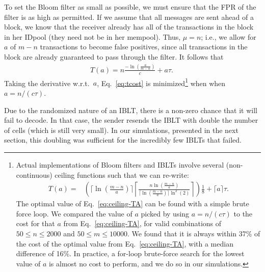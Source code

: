 To set the Bloom filter as small as possible, we must ensure
that the FPR of the filter is as high as permitted. If we assume 
that all \inv messages are sent ahead of a block, we know that the receiver already has all
of the transactions in the block in her IDpool (they need not be in her mempool). 
Thus, $\mu=n$; i.e.,  we allow for $a$ of $m-n$ transactions
to become false positives, since all transactions in the block are
already guaranteed to pass through the filter. It follows that
\vspace{0.5ex}
\begin{align}
T(a) = n\frac{-\ln(\frac{a}{m-n})}{c}+ a\tau.~\label{eq:tcost}
\end{align}
Taking the derivative w.r.t.\ $a$, Eq.~\ref{eq:tcost} is
minimized\footnote{ Actual implementations of Bloom filters and IBLTs
  involve several (non-continuous) ceiling functions such that we can re-write:
\vspace{-2ex}
\begin{align}
T(a) =& \left(\lceil\ln(\frac{m-n}{a})\rceil\left\lceil  \frac{n\ln(\frac{m-n}{a})}{\lceil\ln(\frac{m-n}{a})\rceil\ln^2(2)} \right\rceil\right)\frac18 + \lceil a\rceil\tau.\label{eq:ceiling-TA}
\end{align}
The optimal value of Eq.~\ref{eq:ceiling-TA} can be found with a simple brute force
loop.  We compared the value of $a$ picked by using 
$a=n/(c\tau)$ to the cost for that $a$ from Eq.~\ref{eq:ceiling-TA}, for valid combinations of $50\leq n \leq 2000$
and $50\leq m \leq 10000$. We found that it is always within 37\% of
the cost of the optimal value from Eq.~\ref{eq:ceiling-TA}, with a median difference of 16\%. In
practice, a for-loop brute-force search for the lowest value of $a$ is
almost no cost to perform, and we do so in our simulations.}
 when when $a=n/(c\tau)$.



Due to the randomized nature of an IBLT,
there is a non-zero chance that it will fail to decode. In that case,
the sender resends the IBLT with double the number of cells (which is
still very small). In our simulations, presented in the next section,
this doubling was sufficient for the incredibly  few IBLTs that 
failed.

